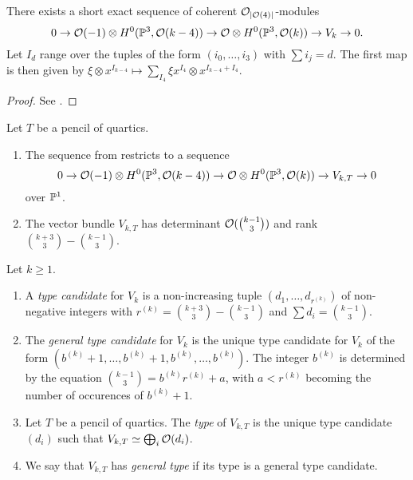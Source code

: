 \begin{proposition} \label{verlinde-exact-sequence}
There exists a short exact sequence of coherent
$\mathcal{O}_{\lvert\mathcal{O}(4)\rvert}$-modules 
\[
0 \to \mathcal{O}(-1) \otimes H^0(\mathbb{P}^3, \mathcal{O}(k-4)) \to \mathcal{O} \otimes H^0(\mathbb{P}^3, \mathcal{O}(k)) \to V_k \to 0.
\]
Let $I_d$ range over the tuples of the form
$(i_0,\dotsc,i_3)$
with
$\sum i_j = d$.
The first map is then given by 
$\xi \otimes x^{I_{k-4}}
\mapsto
\sum_{I_4} \xi x^{I_4} \otimes x^{I_{k-4}+I_4}$.   
\end{proposition}

\begin{proof}
See \cite[Proposition 4.2]{hemminghaus-verlinde-bundles}.
\end{proof}

\begin{remark}
Let $T$ be a pencil of quartics.

\begin{enumerate}
\item The sequence from  restricts to a sequence
\[
0 \to \mathcal{O}(-1) \otimes H^0(\mathbb{P}^3, \mathcal{O}(k-4)) \to \mathcal{O} \otimes H^0(\mathbb{P}^3, \mathcal{O}(k)) \to V_{k,T} \to 0
\]
over $\mathbb{P}^1$.

\item The vector bundle $V_{k,T}$ has determinant $\mathcal{O}(\binom{k-1}{3})$ and rank $\binom{k+3}{3} - \binom{k-1}{3}$.
\end{enumerate}
\end{remark}

\begin{definition}
Let $k\geq 1$.

\begin{enumerate}
\item A \emph{type candidate} for $V_k$ is a non-increasing tuple $(d_1,\dotsc,d_{r^{(k)}})$ of non-negative integers with
$r^{(k)}=\binom{k+3}{3}-\binom{k-1}{3}$ and $\sum d_i = \binom{k-1}{3}$.

\item The \emph{general type candidate} for $V_k$ is the unique type candidate for $V_k$ of the form
$(b^{(k)} + 1,\dotsc,b^{(k)} + 1,b^{(k)},\dotsc,b^{(k)})$. The integer $b^{(k)}$ is determined by the equation
$\binom{k-1}{3} = b^{(k)} r^{(k)} + a$, with $a < r^{(k)}$ becoming the number of occurences of $b^{(k)} +1$. 

\item Let $T$ be a pencil of quartics. The \emph{type} of $V_{k,T}$ is the unique type candidate $(d_i)$ such that
$V_{k,T} \simeq \bigoplus_i \mathcal{O}(d_i)$.

\item We say that $V_{k,T}$ has \emph{general type} if its type is a general type candidate.

\end{enumerate}
\end{definition}

